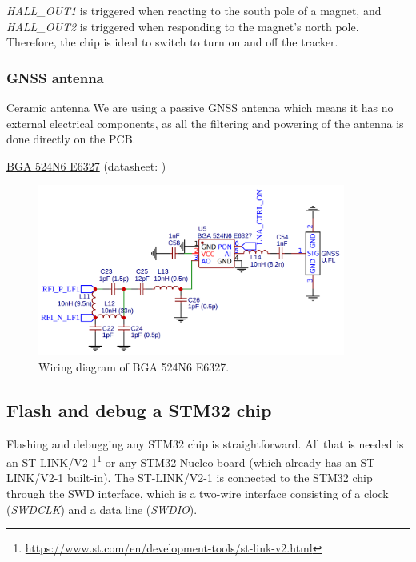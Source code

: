 \textit{HALL\_OUT1} is triggered when reacting to the south pole of a magnet, and \textit{HALL\_OUT2} is triggered when responding to the magnet's north pole. Therefore, the chip is ideal to switch to turn on and off the tracker.

\subsubsection{GNSS antenna}
Ceramic antenna
We are using a passive \ac{GNSS} antenna which means it has no external electrical components, as all the filtering and powering of the antenna is done directly on the \ac{PCB}.

\hyperref[bom:bga524n6e6327]{BGA 524N6 E6327} (datasheet: )

\begin{figure}[H]
    \centering
    \includegraphics[width=0.9\textwidth]{figures/BGA524N6E6327.png}
    \caption{Wiring diagram of BGA 524N6 E6327.}
    \label{fig:schematic:bga524n6e6327}
\end{figure}

\subsection{Flash and debug a STM32 chip} \label{sec:flash_debug_stm32}
Flashing and debugging any STM32 chip is straightforward. All that is needed is an ST-LINK/V2-1\footnote{\url{https://www.st.com/en/development-tools/st-link-v2.html}} or any STM32 Nucleo board (which already has an ST-LINK/V2-1 built-in). The ST-LINK/V2-1 is connected to the STM32 chip through the \ac{SWD} interface, which is a two-wire interface consisting of a clock (\textit{SWDCLK}) and a data line (\textit{SWDIO}). 

